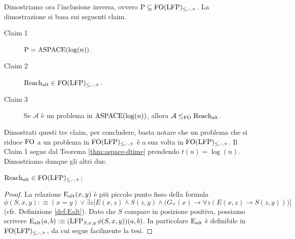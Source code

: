 Dimostriamo ora l'inclusione inversa, ovvero $\operatorname{P} \subseteq \operatorname{FO}(\operatorname{LFP})_{\leq,\cdot,+}$. La
dimostrazione si basa sui seguenti claim.
\begin{description}
 \item[Claim 1]\label{p_eq_a} $\operatorname{P} = \operatorname{ASPACE}(\log(n))$.
 \item[Claim 2]\label{ralt_in_p} $\operatorname{Reach_{alt}} \in \operatorname{FO}(\operatorname{LFP})_{\leq,\cdot,+}$.
 \item[Claim 3]\label{reduct_fo} Se $\mathcal{A}$ è un problema in $\operatorname{ASPACE}(\log(n))$, allora $\mathcal{A} \leq_{\operatorname{FO}} \operatorname{Reach_{alt}}$.
\end{description}
Dimostrati questi tre claim, per concludere, basta notare che un problema che si
riduce $\operatorname{FO}$ a un problema in $\operatorname{FO}(\operatorname{LFP})_{\leq,\cdot,+}$ è a sua volta in $\operatorname{FO}(\operatorname{LFP})_{\leq,\cdot,+}$.
Il Claim 1 segue dal Teorema \ref{thm:aspace-dtime} prendendo $t(n) = \log(n)$.
Dimostriamo dunque gli altri due.
\begin{proposizione}
\label{prop:ralt-in-fo(lfp)}
  $\operatorname{Reach_{alt}} \in \operatorname{FO}(\operatorname{LFP})_{\leq,\cdot,+}$;
\end{proposizione}
\begin{proof}
 La relazione $\operatorname{E_{alt}}(x,y)$ è più piccolo punto fisso della formula
 \[ \phi(S,x,y) :\equiv (x=y) \lor \exists z 
  \Big[ E(x,z) \land S(z,y) \land \Big(G_\forall(x) \rightarrow \forall z\left(E(x,z) \rightarrow S(z,y)\right) \Big) \Big]
 \]
 (cfr. Definizione \ref{def:Ealt}). Dato che $S$ compare in posizione positiva,
 possiamo scrivere $\operatorname{E_{alt}}(a,b) :\equiv (\operatorname{LFP}_{S,x,y} \phi(S,x,y))(a,b)$.
 In particolare $\operatorname{E_{alt}}$ è definibile in $\operatorname{FO}(\operatorname{LFP})_{\leq,\cdot,+}$, da cui segue facilmente
 la tesi.
\end{proof}

